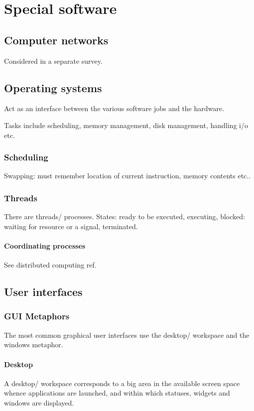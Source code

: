 \documentclass[oneside, article]{memoir}
\begin{document}
\part{Special software}
\chapter{Computer networks}
Considered in a separate survey.

\chapter{Operating systems}
Act as an interface between the various software jobs and the hardware.

Tasks include scheduling, memory management, disk management, handling i/o etc.

\section{Scheduling}
Swapping: must remember location of current instruction, memory contents etc..

\section{Threads}
There are threads/ processes. States: ready to be executed, executing, blocked: waiting for resource or a signal, terminated.

\subsection{Coordinating processes}
See distributed computing ref.

\chapter{User interfaces}
\section{GUI Metaphors}
The most common graphical user interfaces use the desktop/ workspace and the windows metaphor.

\subsection{Desktop}
A desktop/ workspace corresponds to a big area in the available screen space whence applications are launched, and within which statuses, widgets and windows are displayed.
\end{document}
